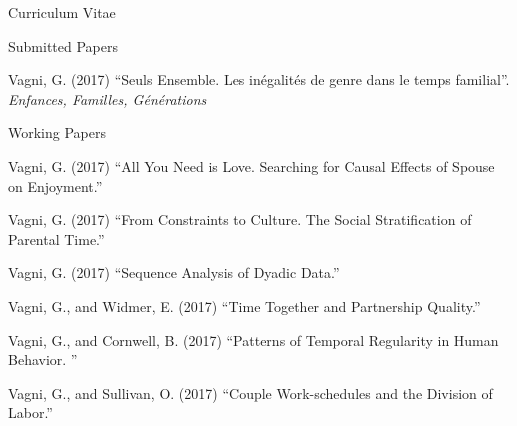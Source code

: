 \documentclass[12pt,a4paper]{article}
\begin{document}
\begin{cv}{Curriculum Vitae}
 \begin{cvlist}{Submitted Papers}
 	\footnotesize   	
 	\item Vagni, G. (2017) ``Seuls Ensemble. Les in{\'e}galit{\'e}s de genre dans le temps familial''. \emph{Enfances, Familles, G{\'e}n{\'e}rations}
 			      
 \end{cvlist}

  \begin{cvlist}{Working Papers}
  	\footnotesize   	
  	\item Vagni, G. (2017) ``All You Need is Love. Searching for Causal Effects of Spouse on Enjoyment.'' 
  	\item Vagni, G. (2017)  ``From Constraints to Culture. The Social Stratification of Parental Time.'' 
  	 \item Vagni, G. (2017)  ``Sequence Analysis of Dyadic Data.'' 
  	\item Vagni, G., and Widmer, E. (2017)  ``Time Together and Partnership Quality.'' 
  	\item Vagni, G., and Cornwell, B. (2017)  ``Patterns of Temporal Regularity in Human Behavior. '' 
  	\item Vagni, G., and Sullivan, O. (2017)  ``Couple Work-schedules and the Division of Labor.''
  	\end{cvlist}

  \date{~June~2017}
\end{cv}
\end{document}
